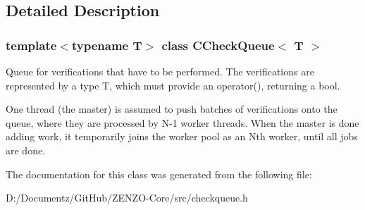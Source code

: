 \subsection{Detailed Description}
\subsubsection*{template$<$typename T$>$\newline
class C\+Check\+Queue$<$ T $>$}

Queue for verifications that have to be performed. The verifications are represented by a type T, which must provide an operator(), returning a bool.

One thread (the master) is assumed to push batches of verifications onto the queue, where they are processed by N-\/1 worker threads. When the master is done adding work, it temporarily joins the worker pool as an N\textquotesingle{}th worker, until all jobs are done. 

The documentation for this class was generated from the following file\+:\begin{DoxyCompactItemize}
\item 
D\+:/\+Documentz/\+Git\+Hub/\+Z\+E\+N\+Z\+O-\/\+Core/src/checkqueue.\+h\end{DoxyCompactItemize}
